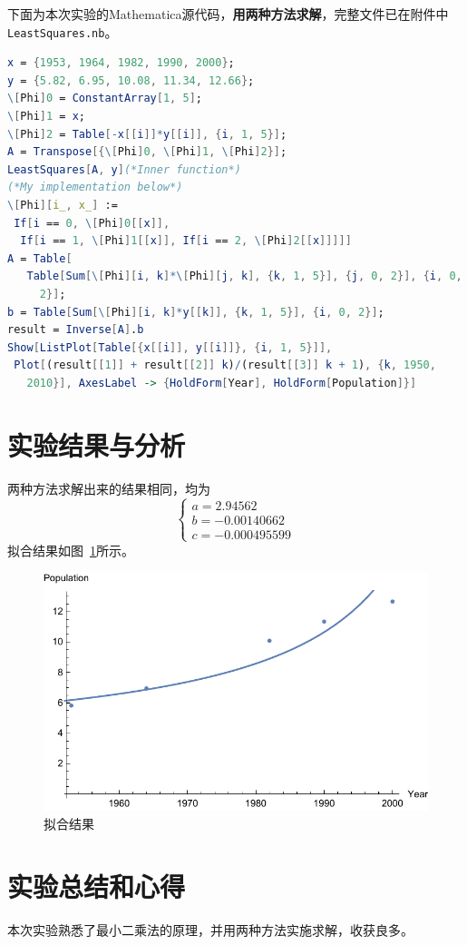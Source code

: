 \documentclass[reportComp]{thesis}
\begin{document}
下面为本次实验的Mathematica源代码，\textbf{用两种方法求解}，完整文件已在附件中\verb'LeastSquares.nb'。
\begin{lstlisting}[language=mathematica]
x = {1953, 1964, 1982, 1990, 2000};
y = {5.82, 6.95, 10.08, 11.34, 12.66};
\[Phi]0 = ConstantArray[1, 5];
\[Phi]1 = x;
\[Phi]2 = Table[-x[[i]]*y[[i]], {i, 1, 5}];
A = Transpose[{\[Phi]0, \[Phi]1, \[Phi]2}];
LeastSquares[A, y](*Inner function*)
(*My implementation below*)
\[Phi][i_, x_] := 
 If[i == 0, \[Phi]0[[x]], 
  If[i == 1, \[Phi]1[[x]], If[i == 2, \[Phi]2[[x]]]]]
A = Table[
   Table[Sum[\[Phi][i, k]*\[Phi][j, k], {k, 1, 5}], {j, 0, 2}], {i, 0,
     2}];
b = Table[Sum[\[Phi][i, k]*y[[k]], {k, 1, 5}], {i, 0, 2}];
result = Inverse[A].b
Show[ListPlot[Table[{x[[i]], y[[i]]}, {i, 1, 5}]], 
 Plot[(result[[1]] + result[[2]] k)/(result[[3]] k + 1), {k, 1950, 
   2010}], AxesLabel -> {HoldForm[Year], HoldForm[Population]}]
\end{lstlisting}

\section{实验结果与分析}
两种方法求解出来的结果相同，均为
\[\begin{cases}
a=2.94562\\
b=-0.00140662\\
c=-0.000495599
\end{cases}\]
拟合结果如图~\ref{fig:res}所示。
\begin{figure}[H]
\centering
\includegraphics[width=0.5\linewidth]{result.pdf}
\caption{拟合结果}
\label{fig:res}
\end{figure}

\section{实验总结和心得}
本次实验熟悉了最小二乘法的原理，并用两种方法实施求解，收获良多。
\end{document}
